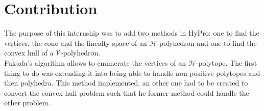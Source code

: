 \section{Contribution}
\label{section_contrib}
The purpose of this internship was to add two methods in HyPro: one to find the vertices, the cone and the linealty space of an $\mathcal{H}$-polyhedron and one to find the convex hull of a $\mathcal{V}$-polyhedron.\\
Fukuda's algorithm allows to enumerate the vertices of an $\mathcal{H}$-polytope. The first thing to do was extending it into being able to handle non positive polytopes and then polyhedra. This method implemented, an other one had to be created to convert the convex hull problem such that he former method could handle the other problem.


